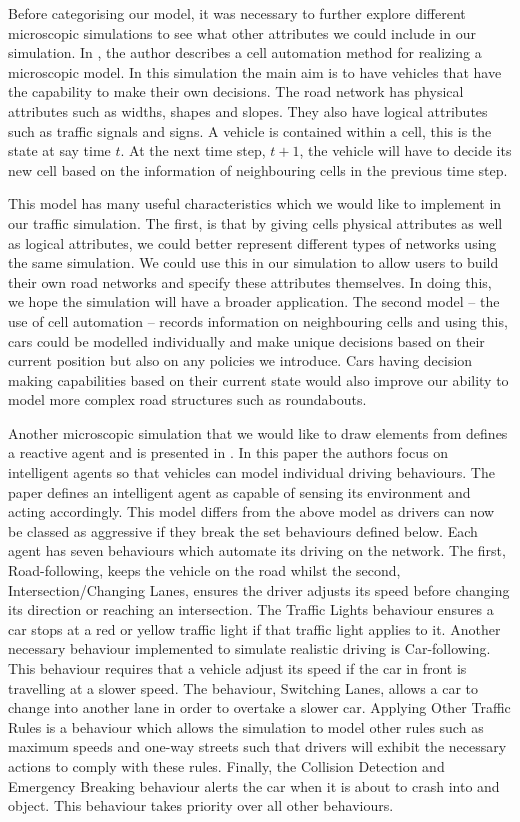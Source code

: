 \documentclass{article}
\begin{document}
	Before categorising our model, it was necessary to further explore different microscopic simulations to see what other attributes we could include in our simulation.
	In \cite{namekawa2005general}, the author describes a cell automation method for realizing a microscopic model. 
	In this simulation the main aim is to have vehicles that have the capability to make their own decisions. 
	The road network has physical attributes such as widths, shapes and slopes. 
	They also have logical attributes such as traffic signals and signs. 
	A vehicle is contained within a cell, this is the state at say time $t$. 
	At the next time step, $t+1$, the vehicle will have to decide its new cell based on the information of neighbouring cells in the previous time step. 
	
	This model has many useful characteristics which we would like to implement in our traffic simulation. The first, is that by giving cells physical attributes as well as logical attributes, we could better represent different types of networks using the same simulation. 
	We could use this in our simulation to allow users to build their own road networks and specify these attributes themselves. In doing this, we hope the simulation will have a broader application. 
	The second model -- the use of cell automation -- records information on neighbouring cells and using this, cars could be modelled individually and make unique decisions based on their current position but also on any policies we introduce. 
	Cars having decision making capabilities based on their current state would also improve our ability to model more complex road structures such as roundabouts.  
	
	Another microscopic simulation that we would like to draw elements from defines a reactive agent and is presented in \cite{ehlert2001microscopic}. In this paper the authors focus on intelligent agents so that vehicles can model individual driving behaviours. 
	The paper defines an intelligent agent as capable of sensing its environment and acting accordingly. This model differs from the above model as drivers can now be classed as aggressive if they break the set behaviours defined below. 
	Each agent has seven behaviours which automate its driving on the network. 
	The first, Road-following, keeps the vehicle on the road whilst the second, Intersection/Changing Lanes, ensures the driver adjusts its speed before changing its direction or reaching an intersection. 
	The Traffic Lights behaviour ensures a car stops at a red or yellow traffic light if that traffic light applies to it.  
	Another necessary behaviour implemented to simulate realistic driving is Car-following. 
	This behaviour requires that a vehicle adjust its speed if the car in front is travelling at a slower speed. 
	The behaviour, Switching Lanes, allows a car to change into another lane in order to overtake a slower car. 
	Applying Other Traffic Rules is a behaviour which allows the simulation to model other rules such as maximum speeds and one-way streets such that drivers will exhibit the necessary actions to comply with these rules. 
	Finally, the Collision Detection and Emergency Breaking behaviour alerts the car when it is about to crash into and object. 
	This behaviour takes priority over all other behaviours. 
	
\end{document}
